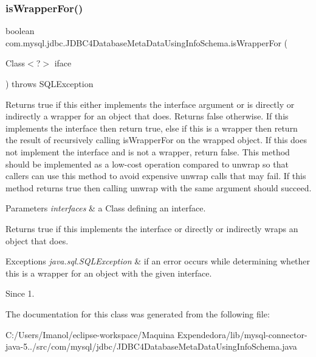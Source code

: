 \subsubsection{\texorpdfstring{is\+Wrapper\+For()}{isWrapperFor()}}
{\footnotesize\ttfamily boolean com.\+mysql.\+jdbc.\+J\+D\+B\+C4\+Database\+Meta\+Data\+Using\+Info\+Schema.\+is\+Wrapper\+For (\begin{DoxyParamCaption}\item[{Class$<$?$>$}]{iface }\end{DoxyParamCaption}) throws S\+Q\+L\+Exception}

Returns true if this either implements the interface argument or is directly or indirectly a wrapper for an object that does. Returns false otherwise. If this implements the interface then return true, else if this is a wrapper then return the result of recursively calling {\ttfamily is\+Wrapper\+For} on the wrapped object. If this does not implement the interface and is not a wrapper, return false. This method should be implemented as a low-\/cost operation compared to {\ttfamily unwrap} so that callers can use this method to avoid expensive {\ttfamily unwrap} calls that may fail. If this method returns true then calling {\ttfamily unwrap} with the same argument should succeed.


\begin{DoxyParams}{Parameters}
{\em interfaces} & a Class defining an interface. \\
\hline
\end{DoxyParams}
\begin{DoxyReturn}{Returns}
true if this implements the interface or directly or indirectly wraps an object that does. 
\end{DoxyReturn}

\begin{DoxyExceptions}{Exceptions}
{\em java.\+sql.\+S\+Q\+L\+Exception} & if an error occurs while determining whether this is a wrapper for an object with the given interface. \\
\hline
\end{DoxyExceptions}
\begin{DoxySince}{Since}
1. 
\end{DoxySince}


The documentation for this class was generated from the following file\+:\begin{DoxyCompactItemize}
\item 
C\+:/\+Users/\+Imanol/eclipse-\/workspace/\+Maquina Expendedora/lib/mysql-\/connector-\/java-\/5../src/com/mysql/jdbc/J\+D\+B\+C4\+Database\+Meta\+Data\+Using\+Info\+Schema.\+java\end{DoxyCompactItemize}
